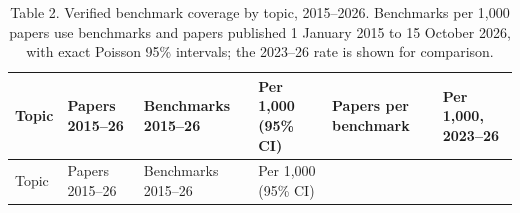 \documentclass[11pt]{article}
\begin{document}
\begin{scriptsize}

\begin{longtable}[]{@{}
  >{\raggedright\arraybackslash}p{}
  >{\raggedright\arraybackslash}p{}
  >{\raggedright\arraybackslash}p{}
  >{\raggedright\arraybackslash}p{}
  >{\raggedright\arraybackslash}p{}
  >{\raggedright\arraybackslash}p{}@{}}
\caption{Table 2. Verified benchmark coverage by topic, 2015--2026.
Benchmarks per 1,000 papers use benchmarks and papers published 1
January 2015 to 15 October 2026, with exact Poisson 95\% intervals; the
2023--26 rate is shown for comparison.}\tabularnewline
\toprule\noalign{}
\begin{minipage}[b]{\linewidth}\raggedright
Topic
\end{minipage} & \begin{minipage}[b]{\linewidth}\raggedright
Papers 2015--26
\end{minipage} & \begin{minipage}[b]{\linewidth}\raggedright
Benchmarks 2015--26
\end{minipage} & \begin{minipage}[b]{\linewidth}\raggedright
Per 1,000 (95\% CI)
\end{minipage} & \begin{minipage}[b]{\linewidth}\raggedright
Papers per benchmark
\end{minipage} & \begin{minipage}[b]{\linewidth}\raggedright
Per 1,000, 2023--26
\end{minipage} \\
\midrule\noalign{}
\endfirsthead
\toprule\noalign{}
\begin{minipage}[b]{\linewidth}\raggedright
Topic
\end{minipage} & \begin{minipage}[b]{\linewidth}\raggedright
Papers 2015--26
\end{minipage} & \begin{minipage}[b]{\linewidth}\raggedright
Benchmarks 2015--26
\end{minipage} & \begin{minipage}[b]{\linewidth}\raggedright
Per 1,000 (95\% CI)
\end{minipage} & \begin{minipage}[b]{\linewidth}\raggedright

\end{minipage}
\end{longtable}
\end{scriptsize}
\end{document}
